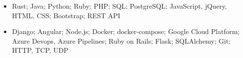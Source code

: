 \begin{cvsubsection}{}{}{}	
	\begin{itemize}
		\item Rust; Java; Python; Ruby; PHP; SQL; PostgreSQL; JavaScript, jQuery, HTML, CSS; Bootstrap; REST API
		\item Django; Angular; Node.js; Docker; docker-compose; Google Cloud Platform; Azure Devops, Azure Pipelines; Ruby on Rails; Flask; SQLAlchemy; Git; HTTP, TCP, UDP
	\end{itemize}
\end{cvsubsection}